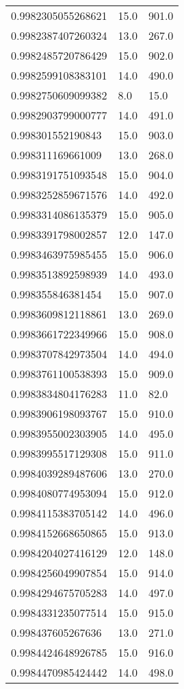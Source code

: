 \begin{center}
\begin{supertabular}[H]{p{0.30\textwidth}p{0.05\textwidth}p{0.05\textwidth}}
0.9982305055268621 & 15.0 & 901.0 \\ 
0.9982387407260324 & 13.0 & 267.0 \\ 
0.9982485720786429 & 15.0 & 902.0 \\ 
0.9982599108383101 & 14.0 & 490.0 \\ 
0.9982750609099382 & 8.0 & 15.0 \\ 
0.9982903799000777 & 14.0 & 491.0 \\ 
0.998301552190843 & 15.0 & 903.0 \\ 
0.998311169661009 & 13.0 & 268.0 \\ 
0.9983191751093548 & 15.0 & 904.0 \\ 
0.9983252859671576 & 14.0 & 492.0 \\ 
0.9983314086135379 & 15.0 & 905.0 \\ 
0.9983391798002857 & 12.0 & 147.0 \\ 
0.9983463975985455 & 15.0 & 906.0 \\ 
0.9983513892598939 & 14.0 & 493.0 \\ 
0.998355846381454 & 15.0 & 907.0 \\ 
0.9983609812118861 & 13.0 & 269.0 \\ 
0.9983661722349966 & 15.0 & 908.0 \\ 
0.9983707842973504 & 14.0 & 494.0 \\ 
0.9983761100538393 & 15.0 & 909.0 \\ 
0.9983834804176283 & 11.0 & 82.0 \\ 
0.9983906198093767 & 15.0 & 910.0 \\ 
0.9983955002303905 & 14.0 & 495.0 \\ 
0.9983995517129308 & 15.0 & 911.0 \\ 
0.9984039289487606 & 13.0 & 270.0 \\ 
0.9984080774953094 & 15.0 & 912.0 \\ 
0.9984115383705142 & 14.0 & 496.0 \\ 
0.9984152668650865 & 15.0 & 913.0 \\ 
0.9984204027416129 & 12.0 & 148.0 \\ 
0.9984256049907854 & 15.0 & 914.0 \\ 
0.9984294675705283 & 14.0 & 497.0 \\ 
0.9984331235077514 & 15.0 & 915.0 \\ 
0.998437605267636 & 13.0 & 271.0 \\ 
0.9984424648926785 & 15.0 & 916.0 \\ 
0.9984470985424442 & 14.0 & 498.0 \\ 

\end{supertabular}
\end{center}

